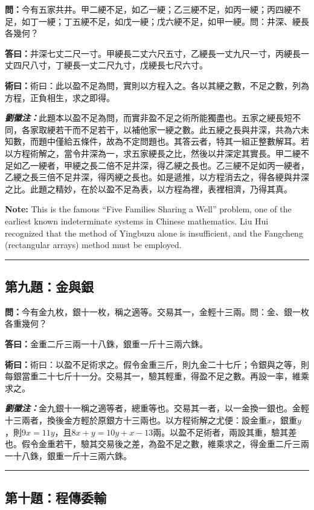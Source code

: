 \documentclass[11pt,a4paper]{article}
\newcommand{\wen}[1]{\textbf{\color{problemcolor}問：}#1\par}
\newcommand{\da}[1]{\textbf{答曰：}#1\par}
\newcommand{\shu}[1]{\textbf{術曰：}#1\par}
\newcommand{\liuhui}[1]{{\color{commentarycolor}\textit{\textbf{劉徽注：}}#1\par}}
\begin{document}
\wen{今有五家共井。甲二綆不足，如乙一綆；乙三綆不足，如丙一綆；丙四綆不足，如丁一綆；丁五綆不足，如戊一綆；戊六綆不足，如甲一綆。問：井深、綆長各幾何？}

\da{井深七丈二尺一寸。甲綆長二丈六尺五寸，乙綆長一丈九尺一寸，丙綆長一丈四尺八寸，丁綆長一丈二尺九寸，戊綆長七尺六寸。}

\shu{術曰：此以盈不足為問，實則以方程入之。各以其綆之數，不足之數，列為方程，正負相生，求之即得。}

\liuhui{此題本以盈不足為問，而實非盈不足之術所能獨盡也。五家之綆長短不同，各家取綆若干而不足若干，以補他家一綆之數。此五綆之長與井深，共為六未知數，而題中僅給五條件，故為不定問題也。其答云者，特其一組正整數解耳。若以方程術解之，當令井深為一，求五家綆長之比，然後以井深定其實長。甲二綆不足如乙一綆者，甲綆之長二倍不足井深，得乙綆之長也。乙三綆不足如丙一綆者，乙綆之長三倍不足井深，得丙綆之長也。如是遞推，以方程消去之，得各綆與井深之比。此題之精妙，在於以盈不足為表，以方程為裡，表裡相濟，乃得其真。}

\textbf{Note:} This is the famous ``Five Families Sharing a Well'' problem, one of the earliest known indeterminate systems in Chinese mathematics. Liu Hui recognized that the method of Yingbuzu alone is insufficient, and the Fangcheng (rectangular arrays) method must be employed.

\bigskip
\hrule
\bigskip

\subsection{第九題：金與銀}

\wen{今有金九枚，銀十一枚，稱之適等。交易其一，金輕十三兩。問：金、銀一枚各重幾何？}

\da{金重二斤三兩一十八銖，銀重一斤十三兩六銖。}

\shu{術曰：以盈不足術求之。假令金重三斤，則九金二十七斤；令銀與之等，則每銀當重二十七斤十一分。交易其一，驗其輕重，得盈不足之數。再設一率，維乘求之。}

\liuhui{金九銀十一稱之適等者，總重等也。交易其一者，以一金換一銀也。金輕十三兩者，換後金方輕於原銀方十三兩也。以方程術解之尤便：設金重$x$，銀重$y$，則$9x = 11y$，且$8x + y = 10y + x - 13$兩。以盈不足術者，兩設其重，驗其差也。假令金重若干，驗其交易後之差，為盈不足之數，維乘求之，得金重二斤三兩一十八銖，銀重一斤十三兩六銖。}

\bigskip
\hrule
\bigskip

\subsection{第十題：程傳委輸}
\end{document}
